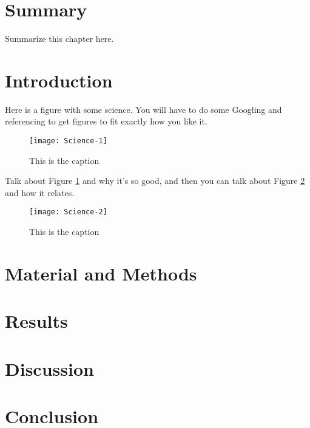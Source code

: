 \section{Summary}

Summarize this chapter here. 

\section{Introduction}

Here is a figure with some science. You will have to do some Googling and referencing to get figures to fit exactly how you like it. 

\begin{figure}[h]
\centering
\texttt{[image: Science-1]}
\caption[Cool science picture 1]{This is the caption}
\centering
\label{fig:Science-1}
\end{figure}

Talk about Figure \ref{fig:Science-1} and why it's so good, and then you can talk about Figure \ref{fig:Science-2} and how it relates. 

\begin{figure}[h]
\centering
\texttt{[image: Science-2]}
\caption[Cool science picture 2]{This is the caption}
\centering
\label{fig:Science-2}
\end{figure}


\section{Material and Methods}

\section{Results}


\section{Discussion}



\section{Conclusion}



\clearpage
